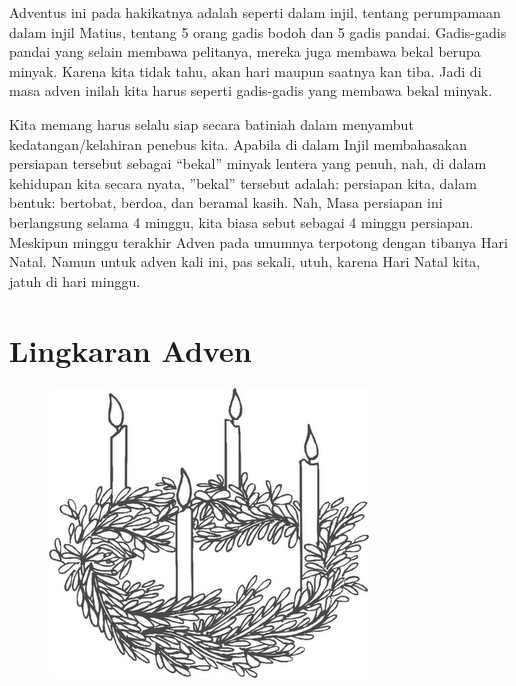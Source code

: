 Adventus ini pada hakikatnya adalah seperti dalam injil, tentang perumpamaan dalam injil Matius, tentang 5 orang gadis bodoh dan 5 gadis pandai. Gadis-gadis pandai yang selain membawa pelitanya, mereka juga membawa bekal berupa minyak. Karena kita tidak tahu, akan hari maupun saatnya kan tiba. Jadi di masa adven inilah kita harus seperti gadis-gadis yang membawa bekal minyak. 

Kita memang harus selalu siap secara batiniah dalam menyambut kedatangan/kelahiran penebus kita. Apabila di dalam Injil membahasakan persiapan tersebut sebagai ``bekal'' minyak lentera yang penuh, nah, di dalam kehidupan kita secara nyata, ''bekal'' tersebut adalah: persiapan kita, dalam bentuk: bertobat, berdoa, dan beramal kasih. Nah, Masa persiapan ini berlangsung selama 4 minggu, kita biasa sebut sebagai 4 minggu persiapan. Meskipun minggu terakhir Adven pada umumnya terpotong dengan tibanya Hari Natal. Namun untuk adven kali ini, pas sekali, utuh, karena Hari Natal kita, jatuh di hari minggu. 

\section*{Lingkaran Adven}

\begin{figure}
\centering
\includegraphics[scale=0.35]{gambar/advent4.png}
\end{figure}



